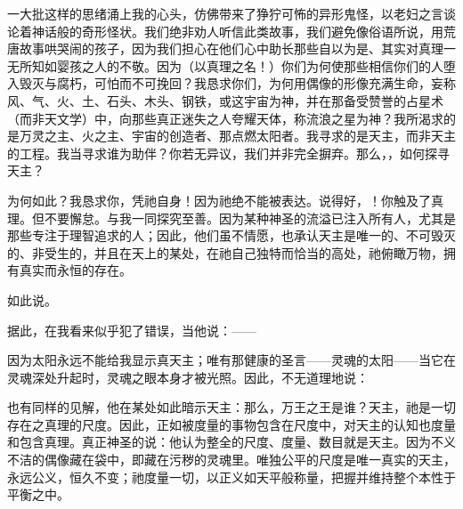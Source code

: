 一大批这样的思绪涌上我的心头，仿佛带来了狰狞可怖的异形鬼怪，以老妇之言谈论着神话般的奇形怪状。我们绝非劝人听信此类故事，我们避免像俗语所说，用荒唐故事哄哭闹的孩子，因为我们担心在他们心中助长那些自以为是、其实对真理一无所知如婴孩之人的不敬。因为（以真理之名！）你们为何使那些相信你们的人堕入毁灭与腐朽，可怕而不可挽回？我恳求你们，为何用偶像的形像充满生命，妄称风、气、火、土、石头、木头、钢铁，或这宇宙为神，并在那备受赞誉的占星术（而非天文学）中，向那些真正迷失之人夸耀天体，称流浪之星为神？我所渴求的是万灵之主、火之主、宇宙的创造者、那点燃太阳者。我寻求的是天主，而非天主的工程。我当寻求谁为助伴？你若无异议，我们并非完全摒弃。那么，，如何探寻天主？\par

为何如此？我恳求你，凭祂自身！因为祂绝不能被表达。说得好，！你触及了真理。但不要懈怠。与我一同探究至善。因为某种神圣的流溢已注入所有人，尤其是那些专注于理智追求的人；因此，他们虽不情愿，也承认天主是唯一的、不可毁灭的、非受生的，并且在天上的某处，在祂自己独特而恰当的高处，祂俯瞰万物，拥有真实而永恒的存在。\par

\newline{}如此说。\par

据此，在我看来似乎犯了错误，当他说：——\par

\par

因为太阳永远不能给我显示真天主；唯有那健康的圣言——灵魂的太阳——当它在灵魂深处升起时，灵魂之眼本身才被光照。因此，不无道理地说：\par

也有同样的见解，他在某处如此暗示天主：那么，万王之王是谁？天主，祂是一切存在之真理的尺度。因此，正如被度量的事物包含在尺度中，对天主的认知也度量和包含真理。真正神圣的说：他认为整全的尺度、度量、数目就是天主。因为不义不洁的偶像藏在袋中，即藏在污秽的灵魂里。唯独公平的尺度是唯一真实的天主，永远公义，恒久不变；祂度量一切，以正义如天平般称量，把握并维持整个本性于平衡之中。\par

